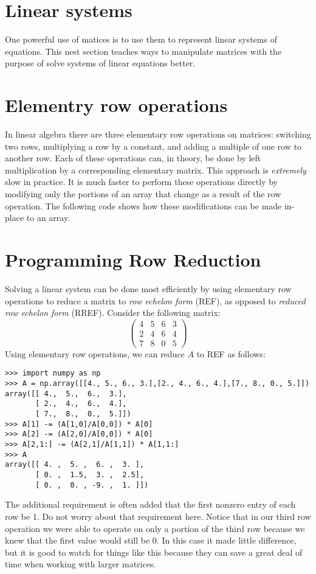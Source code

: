 \section*{Linear systems}
One powerful use of matices is to use them to represent linear systems of equations. This nest section teaches ways to manipulate matrices with the purpose of solve systems of linear equations better. 

\section*{Elementry row operations}

In linear algebra there are three elementary row operations on matrices: switching two rows, multiplying a row by a constant, and adding a multiple of one row to another row.
Each of these operations can, in theory, be done by left multiplication by a corresponding elementary matrix.
This approach is \emph{extremely} slow in practice.
It is much faster to perform these operations directly by modifying only the portions of an array that change as a result of the row operation.
The following code shows how these modifications can be made in-place to an array.


\section*{Programming Row Reduction}
Solving a linear system can be done most efficiently by using elementary row operations to reduce a matrix to \emph{row echelon form} (REF), as opposed to \emph{reduced row echelon form} (RREF).
Consider the following matrix:
\[
\begin{pmatrix}
4&5&6&3 \\
2&4&6&4 \\
7&8&0&5
\end{pmatrix}
\]
Using elementary row operations, we can reduce $A$ to REF as follows:
\begin{lstlisting}
>>> import numpy as np
>>> A = np.array([[4., 5., 6., 3.],[2., 4., 6., 4.],[7., 8., 0., 5.]])
array([[ 4.,  5.,  6.,  3.],
       [ 2.,  4.,  6.,  4.],
       [ 7.,  8.,  0.,  5.]])
>>> A[1] -= (A[1,0]/A[0,0]) * A[0]
>>> A[2] -= (A[2,0]/A[0,0]) * A[0]
>>> A[2,1:] -= (A[2,1]/A[1,1]) * A[1,1:]
>>> A
array([[ 4. ,  5. ,  6. ,  3. ],
       [ 0. ,  1.5,  3. ,  2.5],
       [ 0. ,  0. , -9. ,  1. ]])
\end{lstlisting}
The additional requirement is often added that the first nonzero entry of each row be 1.
Do not worry about that requirement here.
Notice that in our third row operation we were able to operate on only a portion of the third row because we knew that the first value would still be 0.
In this case it made little difference, but it is good to watch for things like this because they can save a great deal of time when working with larger matrices.

